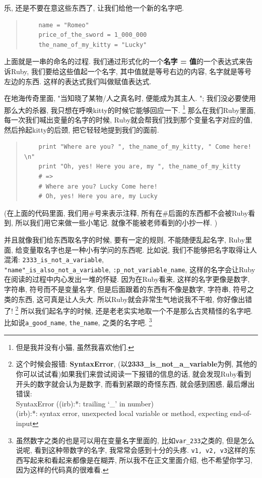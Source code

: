 乐, 还是不要在意这些东西了, 让我们给他一个新的名字吧. 

\begin{quotation}
  \begin{verbatim}
    name = "Romeo"
    price_of_the_sword = 1_000_000
    the_name_of_my_kitty = "Lucky"
  \end{verbatim}
\end{quotation}

上面就是一串的命名的过程. 我们通过形式化的一个\textbf{名字 = 值}的一个表达式来告诉Ruby, 我们要给这些值起一个名字, 其中值就是等号右边的内容, 名字就是等号左边的东西. 这样的表达式我们叫做赋值表达式. 

在地海传奇里面, "当知晓了某物/人之真名时, 便能成为其主人. "; 我们没必要使用那么大的杀器, 我只想在呼唤kitty的时候它能够回应一下. \footnote{但是我并没有小猫, 虽然我喜欢他们. } 那么在我们Ruby里面, 每一次我们喊出变量的名字的时候, Ruby就会帮我们找到那个变量名字对应的值, 然后拎起kitty的后颈, 把它轻轻地提到我们的面前. 

\begin{quotation}
  \begin{verbatim}
    print "Where are you? ", the_name_of_my_kitty, " Come here! \n"
    print "Oh, yes! Here you are, my ", the_name_of_my_kitty
    # =>
    # Where are you? Lucky Come here!
    # Oh, yes! Here you are, my Lucky
  \end{verbatim}
\end{quotation}

(在上面的代码里面, 我们用\#号来表示注释, 所有在\#后面的东西都不会被Ruby看到, 所以我们用它来做一些小笔记. 就像不能被老师看到的小抄一样. )

并且就像我们给东西取名字的时候, 要有一定的规则, 不能随便乱起名字, Ruby里面, 给变量取名字也是一种小有学问的东西呢. 比如说, 我们不能够把名字取得让人混淆: \texttt{2333_is_not_a_variable}, \\\texttt{"name"_is_also_not_a_variable}, \texttt{:p_not_variable_name}, 这样的名字会让Ruby在阅读的过程中内心发出一堆的怀疑. 因为在Ruby看来, 这样的名字更像是数字, 字符串, 符号而不是变量名字, 但是后面跟着的东西有不像是数字, 字符串, 符号之类的东西, 这可真是让人头大. 所以Ruby就会非常生气地说我不干啦, 你好像出错了! \footnote{这个时候会报错: \textbf{SyntaxError}, (以\textbf{2333\_is\_not\_a\_variable}为例, 其他的你可以试试看)如果我们来尝试阅读一下报错的信息的话, 就会发现Ruby看到开头的数字就会认为是数字, 而看到紧跟的奇怪东西, 就会感到困惑, 最后爆出错误: \\ SyntaxError ((irb):*: trailing `\_' in number)\\(irb):*: syntax error, unexpected local variable or method, expecting end-of-input} 所以我们起名字的时候, 还是老老实实地取一个不是那么古灵精怪的名字吧. 比如说\texttt{a_good_name}, \texttt{the_name}, 之类的名字吧. \footnote{虽然数字之类的也是可以用在变量名字里面的, 比如\texttt{var_233}之类的, 但是怎么说呢, 看到这种带数字的名字, 我常常会感到十分的头疼. \texttt{v1, v2, v3}这样的东西写起来和看起来都像是在糊弄, 所以我不在正文里面介绍, 也不希望你学习, 因为这样的代码真的很难看. }

